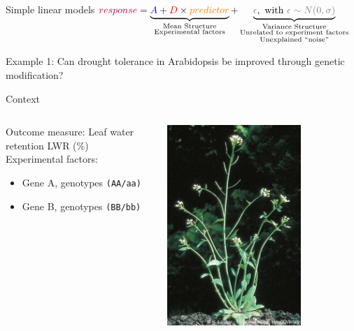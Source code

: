 \documentclass[10pt]{beamer}
\begin{document}
\begin{frame}{Simple linear models}
\centering
\Large
  ${\color{purple}{response}} = \underbrace{{\color{blue}{A}} + {\color{red}{D}} \times {\color{orange}{predictor}}}_{\substack{\text{Mean Structure} \\ \text{Experimental factors}}} + 
  \underbrace{{\color{gray}{\epsilon}}, \text{ with } {\color{gray}{\epsilon \sim N(0,\sigma)}}}_{\substack{\text{Variance Structure} \\ \text{Unrelated to experiment factors} \\ \text{Unexplained ``noise''}}}$

  
\end{frame}

\begin{frame}{Example 1: Can drought tolerance in Arabidopsis be improved through genetic modification?}

\begin{block}{Context}
\begin{columns}
 \begin{column}{0.8\textwidth}
  Outcome measure: Leaf water retention LWR (\%)\\
  Experimental factors:
    \begin{itemize}
     \item Gene A, genotypes \texttt{(AA/aa)}
     \item Gene B, genotypes \texttt{(BB/bb)}
    \end{itemize}
   \end{column}
   \begin{column}{0.2\textwidth}
    \includegraphics[width=0.7\textwidth]{Figures/arabid}
    

\end{column}
\end{columns}
\end{block}
\end{frame}
\end{document}
